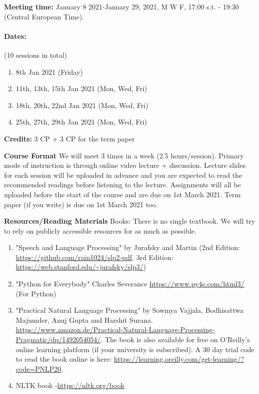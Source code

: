 \documentclass[11pt,a4paper]{article}
\begin{document}
\textbf{\large Meeting time:} 
January 8 2021-January 29, 2021, M W F, 17:00 s.t. - 19:30 (Central European Time). 
\paragraph{Dates: } (10 sessions in total)
\begin{enumerate}
    \item 8th Jan 2021 (Friday)
    \item 11th, 13th, 15th Jan 2021 (Mon, Wed, Fri)
    \item 18th, 20th, 22nd Jan 2021 (Mon, Wed, Fri)
    \item 25th, 27th, 29th Jan 2021 (Mon, Wed, Fri)
\end{enumerate}

\textbf{\large Credits:}
3 CP + 3 CP for the term paper

\bigskip \textbf{Course Format } 
We will meet 3 times in a week (2.5 hours/session). Primary mode of instruction is through online video lecture + discussion. Lecture slides for each session will be uploaded in advance and you are expected to read the recommended readings before listening to the lecture. Assignments will all be uploaded before the start of the course and are due on 1st March 2021. Term paper (if you write) is due on 1st March 2021 too.

\bigskip\textbf{\large Resources/Reading Materials}
Books: There is no single textbook. We will try to rely on publicly accessible resources for as much as possible.
\begin{enumerate}
\item "Speech and Language Processing" by Jurafsky and Martin (2nd Edition: \url{https://github.com/rain1024/slp2-pdf}. 3rd Edition: \url{https://web.stanford.edu/~jurafsky/slp3/})
\item "Python for Everybody" Charles Severance \url{https://www.py4e.com/html3/} (For Python)
\item "Practical Natural Language Processing" by Sowmya Vajjala, Bodhisattwa Majumder, Anuj Gupta and Harshit Surana. \url{https://www.amazon.de/Practical-Natural-Language-Processing-Pragmatic/dp/1492054054/}. The book is also available for free on O'Reilly's online learning platform (if your university is subscribed). A 30 day trial code to read the book online is here: \url{https://learning.oreilly.com/get-learning/?code=PNLP20}.
\item NLTK book -\url{https://nltk.org/book}
\end{enumerate}
\end{document}
